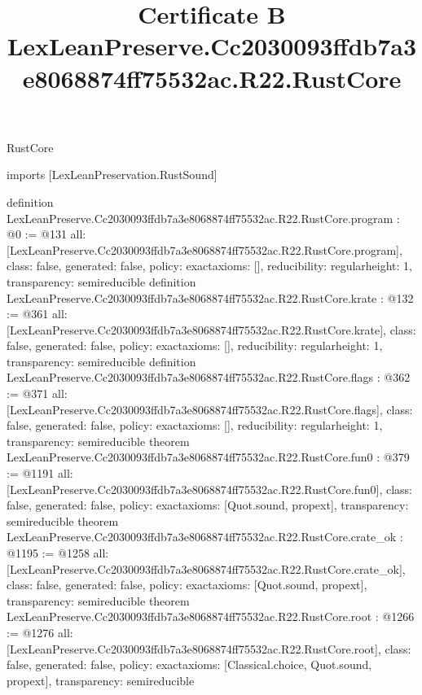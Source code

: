 \begin{lexlean}{RustCore}
\title{Certificate B LexLeanPreserve.Cc2030093ffdb7a3e8068874ff75532ac.R22.RustCore}
\begin{coremodule}
imports [LexLeanPreservation.RustSound]

definition LexLeanPreserve.Cc2030093ffdb7a3e8068874ff75532ac.R22.RustCore.program : @0 := @131 {
  all: [LexLeanPreserve.Cc2030093ffdb7a3e8068874ff75532ac.R22.RustCore.program],
  class: false,
  generated: false,
  policy: exact{axioms: []},
  reducibility: regular{height: 1},
  transparency: semireducible
}
definition LexLeanPreserve.Cc2030093ffdb7a3e8068874ff75532ac.R22.RustCore.krate : @132 := @361 {
  all: [LexLeanPreserve.Cc2030093ffdb7a3e8068874ff75532ac.R22.RustCore.krate],
  class: false,
  generated: false,
  policy: exact{axioms: []},
  reducibility: regular{height: 1},
  transparency: semireducible
}
definition LexLeanPreserve.Cc2030093ffdb7a3e8068874ff75532ac.R22.RustCore.flags : @362 := @371 {
  all: [LexLeanPreserve.Cc2030093ffdb7a3e8068874ff75532ac.R22.RustCore.flags],
  class: false,
  generated: false,
  policy: exact{axioms: []},
  reducibility: regular{height: 1},
  transparency: semireducible
}
theorem LexLeanPreserve.Cc2030093ffdb7a3e8068874ff75532ac.R22.RustCore.fun0 : @379 := @1191 {
  all: [LexLeanPreserve.Cc2030093ffdb7a3e8068874ff75532ac.R22.RustCore.fun0],
  class: false,
  generated: false,
  policy: exact{axioms: [Quot.sound, propext]},
  transparency: semireducible
}
theorem LexLeanPreserve.Cc2030093ffdb7a3e8068874ff75532ac.R22.RustCore.crate_ok : @1195 := @1258 {
  all: [LexLeanPreserve.Cc2030093ffdb7a3e8068874ff75532ac.R22.RustCore.crate_ok],
  class: false,
  generated: false,
  policy: exact{axioms: [Quot.sound, propext]},
  transparency: semireducible
}
theorem LexLeanPreserve.Cc2030093ffdb7a3e8068874ff75532ac.R22.RustCore.root : @1266 := @1276 {
  all: [LexLeanPreserve.Cc2030093ffdb7a3e8068874ff75532ac.R22.RustCore.root],
  class: false,
  generated: false,
  policy: exact{axioms: [Classical.choice, Quot.sound, propext]},
  transparency: semireducible
}


\end{coremodule}
\end{lexlean}
